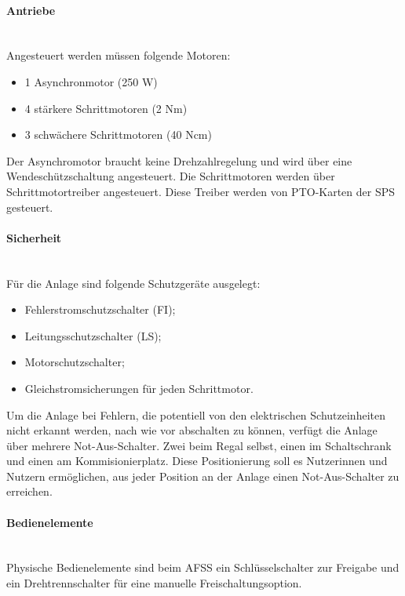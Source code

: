     \paragraph{Antriebe}\mbox{}\\
    Angesteuert werden müssen folgende Motoren:
    \begin{itemize}
        \item 1 Asynchronmotor (250 W)
        \item 4 stärkere Schrittmotoren (2 Nm)
        \item 3 schwächere Schrittmotoren (40 Ncm)
    \end{itemize}
    Der Asynchromotor braucht keine Drehzahlregelung und wird über eine Wendeschützschaltung angesteuert. Die Schrittmotoren werden über Schrittmotortreiber angesteuert. Diese Treiber werden von PTO-Karten der SPS gesteuert.

    \paragraph{Sicherheit}\mbox{}\\
    Für die Anlage sind folgende Schutzgeräte ausgelegt:
    \begin{itemize}
        \item Fehlerstromschutzschalter (FI);
        \item Leitungsschutzschalter (LS);
        \item Motorschutzschalter;
        \item Gleichstromsicherungen für jeden Schrittmotor.
    \end{itemize} 
    Um die Anlage bei Fehlern, die potentiell von den elektrischen Schutzeinheiten nicht erkannt werden, nach wie vor abschalten zu können, verfügt die Anlage über mehrere Not-Aus-Schalter. Zwei beim Regal selbst, einen im Schaltschrank und einen am Kommisionierplatz. Diese Positionierung soll es Nutzerinnen und Nutzern ermöglichen, aus jeder Position an der Anlage einen Not-Aus-Schalter zu erreichen.

    \paragraph{Bedienelemente}\mbox{}\\
    Physische Bedienelemente sind beim AFSS ein Schlüsselschalter zur Freigabe und ein Drehtrennschalter für eine manuelle Freischaltungsoption.

